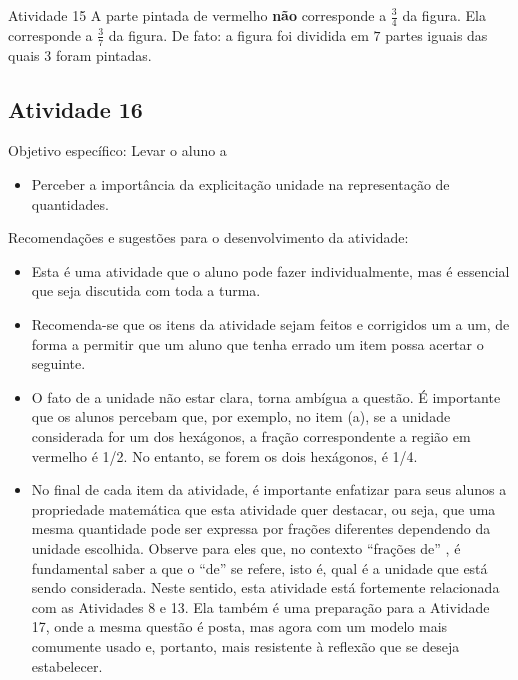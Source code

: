 \documentclass[oneside]{book}
\begin{document}
\begin{multicols}{2}
\begin{resposta*}{Atividade 15}
  A parte pintada de vermelho   {\bf não}   corresponde a   $\frac{3}{4}$   da figura. Ela corresponde a   $\frac{3}{7}$   da figura. De fato: a figura foi dividida em   $7$   partes iguais das quais   $3$   foram pintadas.
\end{resposta*}



\subsection{Atividade 16}



  Objetivo específico: Levar o aluno a
\begin{itemize} %
    \item       Perceber a importância da explicitação unidade na representação de quantidades.
\end{itemize} %


  Recomendações e sugestões para o desenvolvimento da atividade:
\begin{itemize} %
    \item       Esta é uma atividade que o aluno pode fazer individualmente, mas é essencial que seja discutida com toda a turma.
    \item       Recomenda-se que os itens da atividade sejam feitos e corrigidos um a um, de forma a permitir que um aluno que tenha errado um item possa acertar o seguinte.
    \item       O fato de a unidade não estar clara, torna ambígua a questão. É importante que os alunos percebam que, por exemplo, no item (a), se a unidade considerada for um dos hexágonos, a fração correspondente a região em vermelho é 1/2. No entanto, se forem os dois hexágonos, é 1/4.
    \item       No final de cada item da atividade, é importante enfatizar para seus alunos a propriedade matemática que esta atividade quer destacar, ou seja, que uma mesma quantidade pode ser expressa por frações diferentes dependendo da unidade escolhida. Observe para eles que, no contexto       ``frações de''      , é fundamental saber a que o       ``de''       se refere, isto é, qual é a unidade que está sendo considerada. Neste sentido, esta atividade está fortemente relacionada com as Atividades 8 e 13. Ela também é uma preparação para a Atividade 17, onde a mesma questão é posta, mas agora com um modelo mais comumente usado e, portanto, mais resistente à reflexão que se deseja estabelecer.
\end{itemize} %



\end{multicols}
\end{document}
